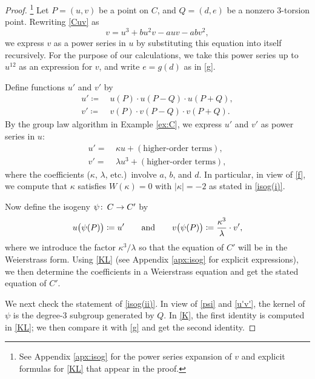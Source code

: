 \documentclass{gtpart}
\theoremstyle{definition}
\theoremstyle{remark}
\def\co{\colon\thinspace}
\newcommand{\ad}{{\rm and}}
\newcommand{\K}{\kappa}
\newcommand{\ce}{\coloneqq}
\numberwithin{equation}{section}
\numberwithin{thm}{section}
\begin{document}
\begin{proof}
 \footnote{See Appendix \ref{apx:isog} for the power series expansion of 
 $v$ and explicit formulas for \eqref{KL} that appear in the proof.  }
 Let $P = (u,v)$ be a point on $C$, and $Q = (d,e)$ be a nonzero 
 3-torsion point.  Rewriting \eqref{Cuv} as 
 \[
  v = u^3 + b u^2 v - a u v - a b v^2, 
 \]
 we express $v$ as a power series in $u$ by substituting this equation 
 into itself recursively.  For the purpose of our calculations, we take 
 this power series up to $u^{12}$ as an expression for $v$, and write 
 $e = g(d)$ as in \eqref{g}.  

 Define functions $u'$ and $v'$ by 
 \begin{equation}
 \label{u'v'}
 \begin{split}
  u' \ce & ~ u(P) \cdot u(P-Q) \cdot u(P+Q), \\
  v' \ce & ~ v(P) \cdot v(P-Q) \cdot v(P+Q).  
 \end{split}
 \end{equation}
 By the group law algorithm in Example \ref{ex:C}, we express $u'$ and 
 $v'$ as power series in $u$: 
 \begin{equation}
 \label{KL}
 \begin{split}
  u' = & ~ \K u + (\text{higher-order terms}), \\
  v' = & ~ \lambda u^3 + (\text{higher-order terms}), 
 \end{split}
 \end{equation}
 where the coefficients ($\K$, $\lambda$, etc.)~involve $a$, $b$, and 
 $d$.  In particular, in view of \eqref{f}, we compute that $\K$ 
 satisfies $W(\K) = 0$ with $|\K| = -2$ as stated in \eqref{isog(i)}.  

 Now define the isogeny $\psi \co C \to C'$ by 
 \begin{equation}
 \label{psi}
  u\big( \psi(P) \big) \ce u' \qquad \ad \qquad 
  v\big( \psi(P) \big) \ce \frac{\K^3}{\lambda} \cdot v', 
 \end{equation}
 where we introduce the factor $\K^3 / \lambda$ so that the equation of 
 $C'$ will be in the Weierstrass form.  Using \eqref{KL} (see Appendix 
 \ref{apx:isog} for explicit expressions), we then determine the 
 coefficients in a Weierstrass equation and get the stated equation of 
 $C'$.  

 We next check the statement of \eqref{isog(ii)}.  In view of 
 \eqref{psi} and \eqref{u'v'}, the kernel of $\psi$ is the degree-3 
 subgroup generated by $Q$.  In \eqref{K}, the first identity is 
 computed in \eqref{KL}; we then compare it with \eqref{g} and get the 
 second identity.  


\end{proof}
\end{document}
